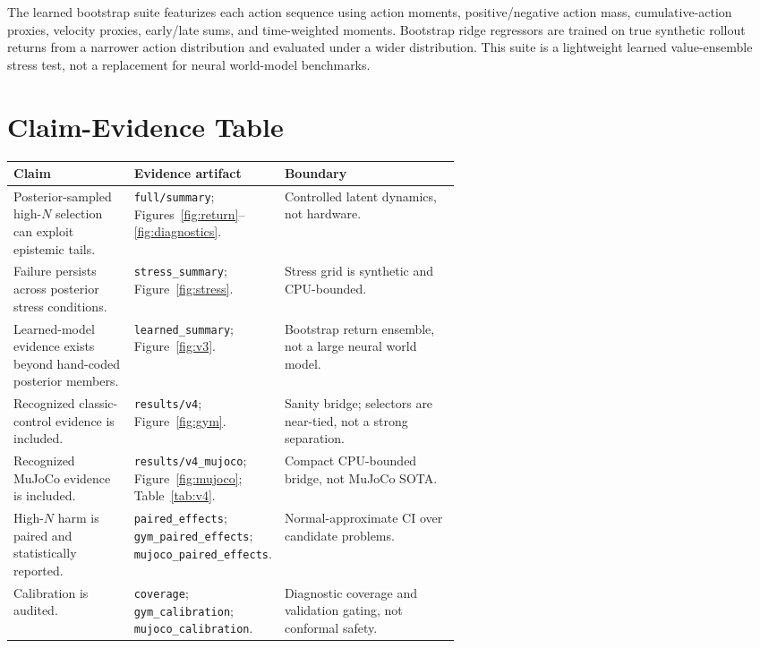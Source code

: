 \documentclass{article}
\begin{document}
The learned bootstrap suite featurizes each action sequence using action
moments, positive/negative action mass, cumulative-action proxies, velocity
proxies, early/late sums, and time-weighted moments. Bootstrap ridge regressors
are trained on true synthetic rollout returns from a narrower action
distribution and evaluated under a wider distribution. This suite is a
lightweight learned value-ensemble stress test, not a replacement for neural
world-model benchmarks.

\section{Claim-Evidence Table}

\begin{center}
\small
\begin{tabularx}{\linewidth}{p{0.27\linewidth}p{0.31\linewidth}X}
\toprule
Claim & Evidence artifact & Boundary \\
\midrule
Posterior-sampled high-$N$ selection can exploit epistemic tails. &
\texttt{full/summary}; Figures~\ref{fig:return}--\ref{fig:diagnostics}. &
Controlled latent dynamics, not hardware. \\
Failure persists across posterior stress conditions. &
\texttt{stress\_summary}; Figure~\ref{fig:stress}. &
Stress grid is synthetic and CPU-bounded. \\
Learned-model evidence exists beyond hand-coded posterior members. &
\texttt{learned\_summary}; Figure~\ref{fig:v3}. &
Bootstrap return ensemble, not a large neural world model. \\
Recognized classic-control evidence is included. &
\texttt{results/v4}; Figure~\ref{fig:gym}. &
Sanity bridge; selectors are near-tied, not a strong separation. \\
Recognized MuJoCo evidence is included. &
\texttt{results/v4\_mujoco}; Figure~\ref{fig:mujoco}; Table~\ref{tab:v4}. &
Compact CPU-bounded bridge, not MuJoCo SOTA. \\
High-$N$ harm is paired and statistically reported. &
\texttt{paired\_effects}; \texttt{gym\_paired\_effects};
\texttt{mujoco\_paired\_effects}. &
Normal-approximate CI over candidate problems. \\
Calibration is audited. &
\texttt{coverage}; \texttt{gym\_calibration}; \texttt{mujoco\_calibration}. &
Diagnostic coverage and validation gating, not conformal safety. \\
\bottomrule
\end{tabularx}
\end{center}
\end{document}
